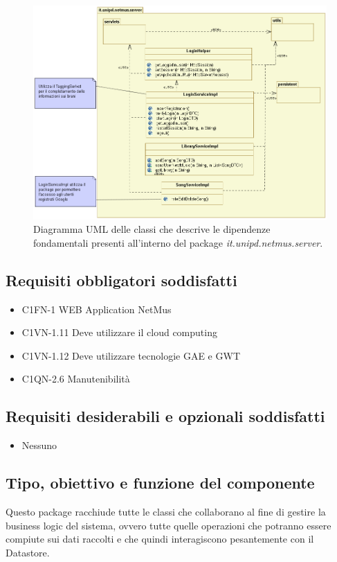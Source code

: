 \begin{figure}[!h]
  \centering
  \includegraphics[width=15cm]{img/DP/classes_server.png}
\caption{Diagramma UML delle classi che descrive le dipendenze
fondamentali presenti all'interno del package
\emph{it.unipd.netmus.server}.}
\end{figure}


\subsection*{Requisiti obbligatori soddisfatti}
\begin{itemize}
	\item C1FN-1 WEB Application NetMus
	\item C1VN-1.11 Deve utilizzare il cloud computing
	\item C1VN-1.12 Deve utilizzare tecnologie GAE e GWT
	\item C1QN-2.6 Manutenibilit\`a
\end{itemize}
\subsection*{Requisiti desiderabili e opzionali soddisfatti}
\begin{itemize}
    \item Nessuno
\end{itemize}
\subsection*{Tipo, obiettivo e funzione del componente} %
Questo package racchiude tutte le classi che collaborano al fine di gestire la
business logic del sistema, ovvero tutte quelle operazioni che potranno essere
compiute sui dati raccolti e che quindi interagiscono pesantemente con il
Datastore. 
